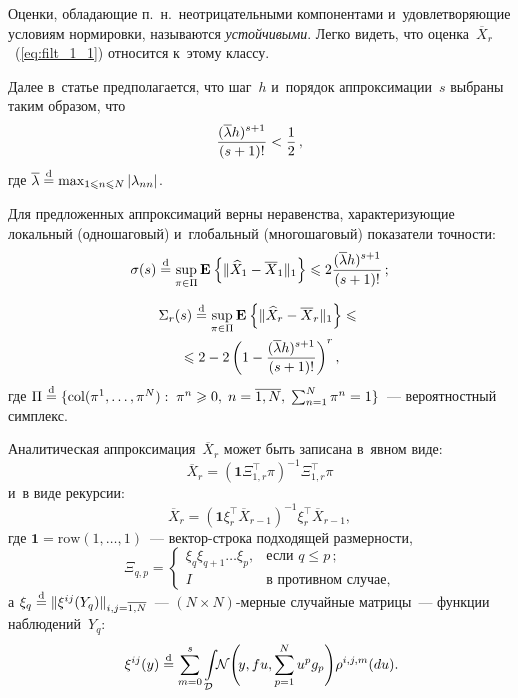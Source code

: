 \begin{multicols}{2}
 
 Оценки, обладающие п.~н.\ неотрицательными компонентами и~удовлетворяющие 
 условиям нормировки, называются \textit{устойчивыми}. Легко видеть, что 
 оценка~$\overline{X}_r$~(\ref{eq:filt_1_1}) относится к~этому классу.
 
 Далее в~статье предполагается, что шаг~$h$ и~порядок аппроксимации~$s$ 
 выбраны таким образом, что 
 $$
 \displaystyle\frac{\displaystyle (\overline{\lambda}h)^{s+1}\mathstrut}{\displaystyle (s+1)!\mathstrut} < 
\displaystyle\frac{\displaystyle 1\mathstrut}{\displaystyle 2\mathstrut}\,,
$$ 
где $\overline{\lambda} \stackrel{\mathrm{d}}{=} \max\nolimits_{1 \leqslant n 
 \leqslant N}|\lambda_{n n}|$.
 
 Для предложенных аппроксимаций верны неравенства, характеризующие 
 локальный (одношаговый) и~глобальный (многошаговый) показатели точности:
 \begin{equation}
 \sigma(s) \stackrel{\mathrm{d}}{=} \sup\limits_{\pi \in \Pi}\mathbf{E}_{  }\left\{ \mathop{\|\widehat{X}_{1} - \overline{X}_{1}\|_{1}} \right\} 
 \leqslant
 2 \displaystyle\frac{\displaystyle (\overline{\lambda}h)^{s+1}\mathstrut}{\displaystyle (s+1)!\mathstrut}\,;
 \label{eq:analyt_loc}
 \end{equation}
 
 \vspace*{-12pt}
 
 \noindent
  \begin{multline}
\Sigma_r(s) \stackrel{\mathrm{d}}{=} \sup\limits_{\pi \in \Pi}\mathbf{E}_{  }\left\{ \mathop{\|\widehat{X}_{r} - \overline{X}_{r}\|_{1}} \right\} 
\leqslant{}\\
{}\leqslant
 2-2\left(1-\displaystyle\frac{\displaystyle (\overline{\lambda}h)^{s+1}\mathstrut}{\displaystyle (s+1)!\mathstrut}\right)^r ,
 \label{eq:analyt_glob}
 \end{multline}
где $\Pi \stackrel{\mathrm{d}}{=} \{\mathop{\mathrm{col}}(\pi^1, \ldots , \pi^N): \; \pi^n \geqslant 0,\; 
n=\overline{1,N},\;\sum\nolimits_{n=1}^N \pi^n =1 \}$~--- вероятностный симплекс.

Аналитическая аппроксимация~$\overline{X}_r$ может быть записана в~явном виде:
\begin{equation}
\overline{X}_r = (\mathbf{1}\Xi_{1,r}^{\top}\pi)^{-1} \Xi_{1,r}^{\top}\pi
 \label{eq:filt_2}
 \end{equation}
 и~в виде рекурсии:
 \begin{equation}
\overline{X}_r = (\mathbf{1}\xi_{r}^{\top}\overline{X}_{r-1})^{-1} \xi_{r}^{\top}\overline{X}_{r-1},
 \label{eq:filt_3}
 \end{equation}
 где $\mathbf{1} = \mathrm{row} (1,\ldots,1)$~--- век\-тор-стро\-ка подходящей размерности,
$$
 \Xi_{q,p} =  
\begin{cases}
 \xi_{q}\xi_{q+1}\ldots \xi_p, & \mbox{если }  q \leqslant p\,; \\
 I &  \mbox{в противном случае,}
\end{cases}
$$
  а $\xi_q \stackrel{\mathrm{d}}{=} \|\xi^{ij}(Y_q)\|_{i,j=\overline{1,N}}$~--- $(N \times N)$-мер\-ные 
  случайные матрицы~--- функции наблюдений~$Y_q$: 
 \begin{equation}
 \xi^{ij}(y)\stackrel{\mathrm{d}}{=} 
\sum\limits_{m=0}^s \int\limits_{\mathcal{D}}\!\! 
 \mathcal{N}\!\left(\!y,f u,\sum_{p=1}^N u^p g_p\right)\!
 \rho^{i,j,m}(du).\!\!
 \label{eq:xi_def}
 \end{equation}


\end{multicols}
